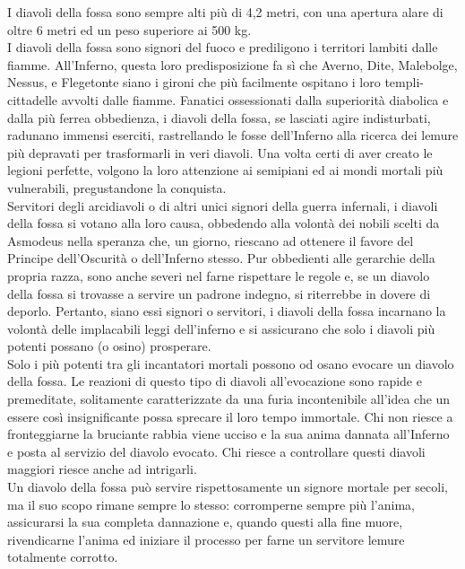 \begin{multicols}{2}
I diavoli della fossa sono sempre alti più di 4,2 metri, con una apertura alare di oltre 6 metri ed un peso superiore ai 500 kg.\\

I diavoli della fossa sono signori del fuoco e prediligono i territori lambiti dalle fiamme. All’Inferno, questa loro predisposizione fa sì che Averno, Dite, Malebolge, Nessus, e Flegetonte siano i gironi che più facilmente ospitano i loro templi-cittadelle avvolti dalle fiamme. Fanatici ossessionati dalla superiorità diabolica e dalla più ferrea obbedienza, i diavoli della fossa, se lasciati agire indisturbati, radunano immensi eserciti, rastrellando le fosse dell’Inferno alla ricerca dei lemure più depravati per trasformarli in veri diavoli. Una volta certi di aver creato le legioni perfette, volgono la loro attenzione ai semipiani ed ai mondi mortali più vulnerabili, pregustandone la conquista.\\

Servitori degli arcidiavoli o di altri unici signori della guerra infernali, i diavoli della fossa si votano alla loro causa, obbedendo alla volontà dei nobili scelti da Asmodeus nella speranza che, un giorno, riescano ad ottenere il favore del Principe dell’Oscurità o dell’Inferno stesso. Pur obbedienti alle gerarchie della propria razza, sono anche severi nel farne rispettare le regole e, se un diavolo della fossa si trovasse a servire un padrone indegno, si riterrebbe in dovere di deporlo. Pertanto, siano essi signori o servitori, i diavoli della fossa incarnano la volontà delle implacabili leggi dell’inferno e si assicurano che solo i diavoli più potenti possano (o osino) prosperare.\\

Solo i più potenti tra gli incantatori mortali possono od osano evocare un diavolo della fossa. Le reazioni di questo tipo di diavoli all'evocazione sono rapide e premeditate, solitamente caratterizzate da una furia incontenibile all'idea che un essere così insignificante possa sprecare il loro tempo immortale. Chi non riesce a fronteggiarne la bruciante rabbia viene ucciso e la sua anima dannata all'Inferno e posta al servizio del diavolo evocato. Chi riesce a controllare questi diavoli maggiori riesce anche ad intrigarli.\\

Un diavolo della fossa può servire rispettosamente un signore mortale per secoli, ma il suo scopo rimane sempre lo stesso: corromperne sempre più l’anima, assicurarsi la sua completa dannazione e, quando questi alla fine muore, rivendicarne l’anima ed iniziare il processo per farne un servitore lemure totalmente corrotto.\\


\end{multicols}
